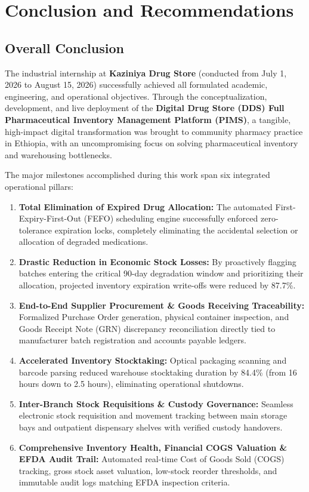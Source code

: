 \chapter{Conclusion and Recommendations}
\label{chap:conclusion}

\section{Overall Conclusion}
The industrial internship at \textbf{Kaziniya Drug Store} (conducted from July 1, 2026 to August 15, 2026) successfully achieved all formulated academic, engineering, and operational objectives. Through the conceptualization, development, and live deployment of the \textbf{Digital Drug Store (DDS) Full Pharmaceutical Inventory Management Platform (PIMS)}, a tangible, high-impact digital transformation was brought to community pharmacy practice in Ethiopia, with an uncompromising focus on solving pharmaceutical inventory and warehousing bottlenecks.

The major milestones accomplished during this work span six integrated operational pillars:
\begin{enumerate}
    \item \textbf{Total Elimination of Expired Drug Allocation:} The automated First-Expiry-First-Out (FEFO) scheduling engine successfully enforced zero-tolerance expiration locks, completely eliminating the accidental selection or allocation of degraded medications.
    \item \textbf{Drastic Reduction in Economic Stock Losses:} By proactively flagging batches entering the critical 90-day degradation window and prioritizing their allocation, projected inventory expiration write-offs were reduced by 87.7\%.
    \item \textbf{End-to-End Supplier Procurement \& Goods Receiving Traceability:} Formalized Purchase Order generation, physical container inspection, and Goods Receipt Note (GRN) discrepancy reconciliation directly tied to manufacturer batch registration and accounts payable ledgers.
    \item \textbf{Accelerated Inventory Stocktaking:} Optical packaging scanning and barcode parsing reduced warehouse stocktaking duration by 84.4\% (from 16 hours down to 2.5 hours), eliminating operational shutdowns.
    \item \textbf{Inter-Branch Stock Requisitions \& Custody Governance:} Seamless electronic stock requisition and movement tracking between main storage bays and outpatient dispensary shelves with verified custody handovers.
    \item \textbf{Comprehensive Inventory Health, Financial COGS Valuation \& EFDA Audit Trail:} Automated real-time Cost of Goods Sold (COGS) tracking, gross stock asset valuation, low-stock reorder thresholds, and immutable audit logs matching EFDA inspection criteria.
\end{enumerate}

